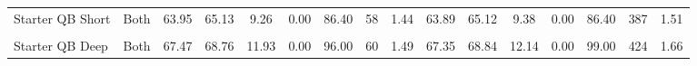 \documentclass[
]{article}
\begin{document}
\begin{table}[!h]
{\begin{tabular}[t]{lccccccccccccccc}
Starter QB Short & Both & 63.95 & 65.13 & 9.26 & 0.00 & 86.40 & 58 & 1.44 & 63.89 & 65.12 & 9.38 & 0.00 & 86.40 & 387 & 1.51\\
\cellcolor{gray!10}{Starter QB Medium} & \cellcolor{gray!10}{Both} & \cellcolor{gray!10}{66.35} & \cellcolor{gray!10}{67.70} & \cellcolor{gray!10}{11.16} & \cellcolor{gray!10}{0.00} & \cellcolor{gray!10}{94.50} & \cellcolor{gray!10}{57} & \cellcolor{gray!10}{1.42} & \cellcolor{gray!10}{66.36} & \cellcolor{gray!10}{67.89} & \cellcolor{gray!10}{11.41} & \cellcolor{gray!10}{0.00} & \cellcolor{gray!10}{94.50} & \cellcolor{gray!10}{395} & \cellcolor{gray!10}{1.54}\\
\addlinespace
Starter QB Deep & Both & 67.47 & 68.76 & 11.93 & 0.00 & 96.00 & 60 & 1.49 & 67.35 & 68.84 & 12.14 & 0.00 & 99.00 & 424 & 1.66\\
\bottomrule
\end{tabular}}
\end{table}
\end{document}
